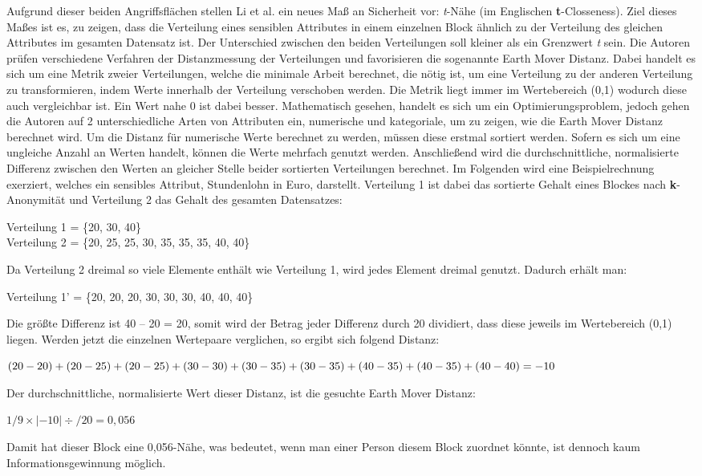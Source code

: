 Aufgrund dieser beiden Angriffsflächen stellen Li et al. \cite{P-25} ein neues Maß an Sicherheit vor: \textit{t}-Nähe (im Englischen \textbf{t}-Closseness).
Ziel dieses Maßes ist es, zu zeigen, dass die Verteilung eines sensiblen Attributes in einem einzelnen Block ähnlich zu der Verteilung des gleichen Attributes im gesamten Datensatz ist.
Der Unterschied zwischen den beiden Verteilungen soll kleiner als ein Grenzwert \textit{t} sein.
Die Autoren prüfen verschiedene Verfahren der Distanzmessung der Verteilungen und favorisieren die sogenannte Earth Mover Distanz.
Dabei handelt es sich um eine Metrik zweier Verteilungen, welche die minimale Arbeit berechnet, die nötig ist, um eine Verteilung zu der anderen Verteilung zu transformieren, indem Werte innerhalb der Verteilung verschoben werden. 
Die Metrik liegt immer im Wertebereich (0,1) wodurch diese auch vergleichbar ist. 
Ein Wert nahe 0 ist dabei besser.
Mathematisch gesehen, handelt es sich um ein Optimierungsproblem, jedoch gehen die Autoren auf 2 unterschiedliche Arten von Attributen ein, numerische und kategoriale, um zu zeigen, wie die Earth Mover Distanz berechnet wird.
Um die Distanz für numerische Werte berechnet zu werden, müssen diese erstmal sortiert werden. 
Sofern es sich um eine ungleiche Anzahl an Werten handelt, können die Werte mehrfach genutzt werden.
Anschließend wird die durchschnittliche, normalisierte Differenz zwischen den Werten an gleicher Stelle beider sortierten Verteilungen berechnet.
Im Folgenden wird eine Beispielrechnung exerziert, welches ein sensibles Attribut, Stundenlohn in Euro, darstellt. 
Verteilung 1 ist dabei das sortierte Gehalt eines Blockes nach \textbf{k}-Anonymität und Verteilung 2 das Gehalt des gesamten Datensatzes:
\begin{addmargin}[25pt]{0pt} Verteilung 1 = \{20, 30, 40\} \\
Verteilung 2 = \{20, 25, 25, 30, 35, 35, 35, 40, 40\} \end{addmargin}
Da Verteilung 2 dreimal so viele Elemente enthält wie Verteilung 1, wird jedes Element dreimal genutzt. 
Dadurch erhält man:
\begin{addmargin}[25pt]{0pt}Verteilung 1' = \{20, 20, 20, 30, 30, 30, 40, 40, 40\} \end{addmargin}
Die größte Differenz ist 40 – 20 = 20, somit wird der Betrag jeder Differenz durch 20 dividiert, dass diese jeweils im Wertebereich (0,1) liegen.
Werden jetzt die einzelnen Wertepaare verglichen, so ergibt sich folgend Distanz:
\begin{addmargin}[25pt]{0pt}
$ (20-20)+(20-25)+(20-25)+(30-30)+(30-35)+(30-35)+(40-35)+\\ (40-35) + (40-40) = -10$
\end{addmargin}
Der durchschnittliche, normalisierte Wert dieser Distanz, ist die gesuchte Earth Mover Distanz:
\begin{addmargin}[25pt]{0pt}
$ 1/9 \times  |-10| \div /20 = 0,056$
\end{addmargin}
Damit hat dieser Block eine 0,056-Nähe, was bedeutet, wenn man einer Person diesem Block zuordnet könnte, ist dennoch kaum Informationsgewinnung möglich.



